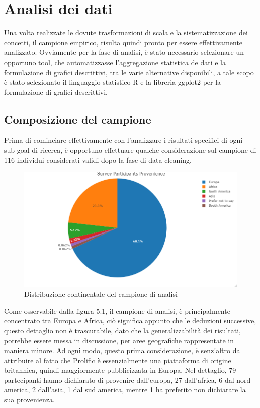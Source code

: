     \section{Analisi dei dati}
    Una volta realizzate le dovute trasformazioni di scala e la sistematizzazione dei concetti, il campione empirico, risulta quindi pronto per essere effettivamente analizzato. Ovviamente per la fase di analisi, è stato necessario selezionare un opportuno tool, che automatizzasse l'aggregazione statistica de dati e la formulazione di grafici descrittivi, tra le varie alternative disponibili, a tale scopo è stato selezionato il linguaggio statistico R e la libreria ggplot2 per la formulazione di grafici descrittivi.
    
    \subsection{Composizione del campione}
    
    Prima di cominciare effettivamente con l'analizzare i risultati specifici di ogni sub-goal di ricerca, è opportuno effettuare qualche considerazione sul campione di 116 individui considerati validi dopo la fase di data cleaning. \\

    
    \begin{figure}[h]
        \centering
        \includegraphics[width=1\textwidth]{figure/Analisi/Background/Survey_Partecipants_Provenience.png}
        \caption{Distribuzione continentale del campione di analisi}
    \end{figure}
    
    Come osservabile dalla figura 5.1, il campione di analisi, è principalmente concentrato tra Europa e Africa, ciò significa appunto che le deduzioni successive, questo dettaglio non è trascurabile, dato che la generalizzabilità dei risultati, potrebbe essere messa in discussione, per aree geografiche rappresentate in maniera minore. Ad ogni modo, questo prima considerazione, è senz'altro da attribuire al fatto che Prolific è essenzialmente una piattaforma di origine britannica, quindi maggiormente pubblicizzata in Europa. Nel dettaglio, 79 partecipanti hanno dichiarato di provenire dall'europa, 27 dall'africa, 6 dal nord america, 2 dall'asia, 1 dal sud america, mentre 1 ha preferito non dichiarare la sua provenienza.
    
